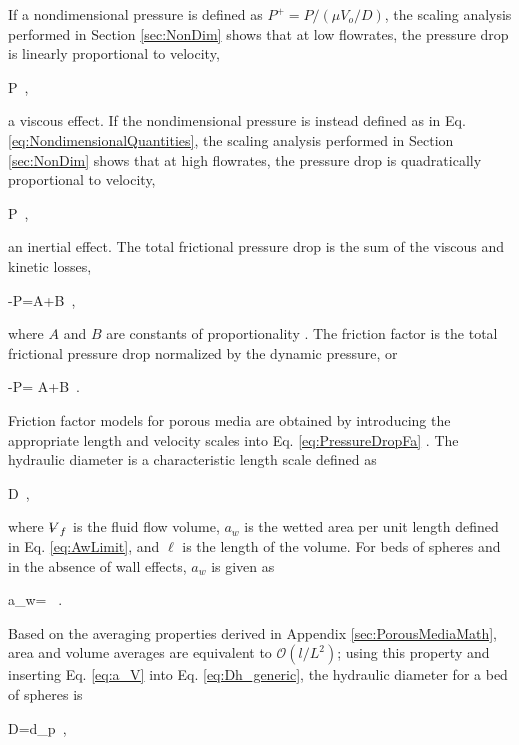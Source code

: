 If a nondimensional pressure is defined as \(P^+=P/(\mu V_o/D)\), the scaling analysis performed in Section \ref{sec:NonDim} shows that at low flowrates, the pressure drop is linearly proportional to velocity,

\beq
\label{eq:FrictionDragProportionality}
\nabla P\propto{}\ ,
\eeq

\noindent a viscous effect. If the nondimensional pressure is instead defined as in Eq. \eqref{eq:NondimensionalQuantities}, the scaling analysis performed in Section \ref{sec:NonDim} shows that at high flowrates, the pressure drop is quadratically proportional to velocity,

\beq
\label{eq:FormDragProportionality}
\nabla P\propto{}\ ,
\eeq

\noindent an inertial effect. The total frictional pressure drop is the sum of the viscous and kinetic losses,

\beq
\label{eq:TotalPressureDrop}
-\nabla P=A+B\ ,
\eeq

\noindent where \(A\) and \(B\) are constants of proportionality \cite{macdonald}. The friction factor is the total frictional pressure drop normalized by the dynamic pressure, or

\beq
\label{eq:PressureDropFa}
-\nabla P= A+B\ .
\eeq

\noindent Friction factor models for porous media are obtained by introducing the appropriate length and velocity scales into Eq. \eqref{eq:PressureDropFa} \cite{ergun}. The hydraulic diameter is a characteristic length scale defined as

\beq
\label{eq:Dh_generic}
D\equiv{}\ ,
\eeq

\noindent where \(\volume_f\) is the fluid flow volume, \(a_w\) is the wetted area per unit length defined in Eq. \eqref{eq:AwLimit}, and \(\ell\) is the length of the volume. For beds of spheres and in the absence of wall effects, \(a_w\) is given as \cite{achenbach}

\beq
\label{eq:a_V}
a_w= \ .
\eeq

\noindent Based on the averaging properties derived in Appendix \ref{sec:PorousMediaMath}, area and volume averages are equivalent to \(\mathcal{O}(l/L^2)\); using this property and inserting Eq. \eqref{eq:a_V} into Eq. \eqref{eq:Dh_generic}, the hydraulic diameter for a bed of spheres is

\beq
\label{eq:Dh}
D=d_p\ ,
\eeq

